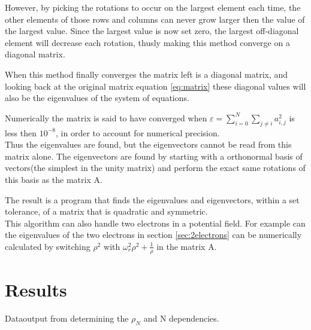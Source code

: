 \documentclass[11pt,a4paper,notitlepage]{article}
\begin{document}
However, by picking the rotations to occur on the largest element each time,
the other elements of those rows and columns can never grow larger then the value of the largest value. Since the largest value is now set zero, the largest off-diagonal element will decrease each rotation, thusly making this method converge on a diagonal matrix. 

When this method finally converges the matrix left is a diagonal matrix, and looking back at the original matrix equation \eqref{eq:matrix} these diagonal values will also be the eigenvalues of the system of equations.

Numerically the matrix is said to have converged when $\varepsilon = \sum_{i=0}^N \sum_{j\neq i} a_{i,j}^2$ is less then $10^{-8}$, in order to account for numerical precision. \\

Thus the eigenvalues are found, but the eigenvectors cannot be read from this matrix alone. The eigenvectors are found by starting with a orthonormal basis of vectors(the simplest in the unity matrix) and perform the exact same rotations of this basis as the matrix A.

The result is a program that finds the eigenvalues and eigenvectors, within a set tolerance, of a matrix that is quadratic and symmetric. \\

This algorithm can also handle two electrons in a potential field. For example can the eigenvalues of the two electrons in section \ref{sec:2electrons} can be numerically calculated by switching $\rho^2$ with $\omega_r^2\rho^2 + \frac{1}{\rho}$ in the matrix A.

\section{Results}
Dataoutput from determining the $\rho_N$ and N dependencies.

\end{document}
